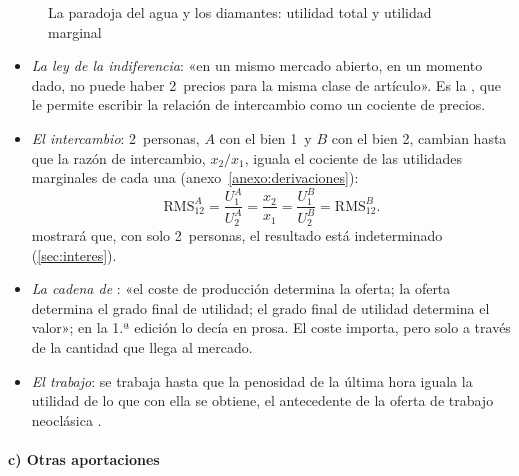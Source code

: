 \documentclass[11pt]{article}
\begin{document}
\begin{figure}[H]
\centering
\caption{La paradoja del agua y los diamantes: utilidad total y utilidad marginal}\label{fig:agua-diamantes}
\end{figure}

\begin{itemize}
\item \emph{La ley de la indiferencia}: «en un mismo mercado abierto, en un momento dado, no puede haber 2~precios para la misma clase de artículo»\nocite{Jevons1871Theory}. Es la , que le permite escribir la relación de intercambio como un cociente de precios.
\item \emph{El intercambio}: 2~personas, $A$ con el bien 1~y $B$ con el bien 2, cambian hasta que la razón de intercambio, $x_2/x_1$, iguala el cociente de las utilidades marginales de cada una (anexo~\ref{anexo:derivaciones}):
  \begin{equation}
  \mathrm{RMS}^A_{12}=\frac{U^A_1}{U^A_2}=\frac{x_2}{x_1}=\frac{U^B_1}{U^B_2}=\mathrm{RMS}^B_{12}. \label{eq:intercambio-jevons}
  \end{equation}
   mostrará que, con solo 2~personas, el resultado está indeterminado (\ref{sec:interes}).
\item \emph{La cadena de }: «el coste de producción determina la oferta; la oferta determina el grado final de utilidad; el grado final de utilidad determina el valor»\nocite{Jevons1879Theory}; en la 1.ª edición lo decía en prosa\nocite{Jevons1871Theory}. El coste importa, pero solo a través de la cantidad que llega al mercado.
\item \emph{El trabajo}: se trabaja hasta que la penosidad de la última hora iguala la utilidad de lo que con ella se obtiene, el antecedente de la oferta de trabajo neoclásica .
\end{itemize}

\paragraph{c) Otras aportaciones}
\end{document}
